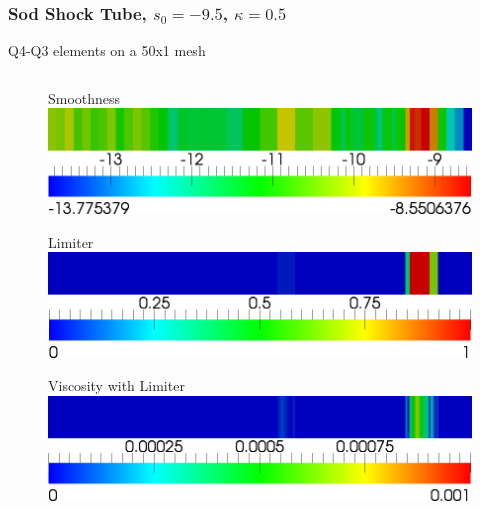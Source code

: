 \documentclass[8pt,xcolor=svgnames]{beamer}
\begin{document}
\begin{frame}\frametitle{Sod Shock Tube, $s_0=-9.5$, $\kappa=0.5$}
\vspace{-1ex}
Q4-Q3 elements on a 50x1 mesh
\vspace{-2ex}
\begin{columns}
\begin{column}{0.3\textwidth}
\begin{figure}[t]
\begin{center}
Smoothness
\includegraphics[width=1.0\textwidth]{figs/Sod/Q4l-50-smoothness.png}
\end{center}
\end{figure}
\begin{figure}[t]
\begin{center}
Limiter
\includegraphics[width=1.0\textwidth]{figs/Sod/Q4l-50-limiter.png}
\end{center}
\end{figure}
\begin{figure}[t]
\begin{center}
Viscosity with Limiter
\includegraphics[width=1.0\textwidth]{figs/Sod/Q4l-50-viscosity.png}
\end{center}
\end{figure}
\begin{figure}[t]
\begin{center}

\end{center}
\end{figure}
\end{column}
\end{columns}
\end{frame}
\end{document}
